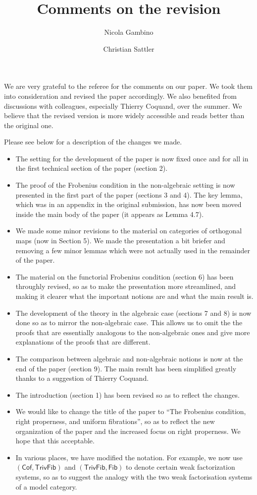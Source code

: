 \documentclass[reqno,10pt,a4paper,oneside,draft]{amsart}
\begin{document}
\title{Comments on the revision} 

\author{Nicola Gambino \and Christian Sattler} 

\maketitle

We are very grateful to the referee for the comments on our paper. We took them into consideration and revised the paper accordingly. We also benefited from
discussions with colleagues, especially Thierry Coquand, over the summer. We believe that the revised version is
more widely accessible and reads better than the original one. 

Please see below for a description of the changes we made.

\begin{itemize}
\item The setting for the development of the paper is now fixed once and for all in the first technical section of the paper (section 2). 
\item The proof of the Frobenius condition in the non-algebraic setting is now presented in the first part of the paper (sections 3 and 4). 
The key lemma, which was in an appendix in the original submission, has now been moved inside the main body of the paper (it appears as Lemma 4.7). 
\item We made some minor revisions to the material on categories of orthogonal maps (now in Section 5). We made the presentation a bit briefer and removing a few minor 
lemmas which were not actually used  in the remainder of the paper.
\item The material on the functorial Frobenius condition (section 6) has been throughly revised, so as to make the presentation more streamlined, and making it 
clearer what the important notions are and what the main result is. 
\item The development of the theory in the algebraic case (sections 7 and 8) is now done so as to mirror the non-algebraic case. This allows us to omit the 
the proofs that are essentially analogous to the non-algebraic ones and give more explanations of the proofs that are different.
\item The comparison between algebraic and non-algebraic notions is now at the end of the paper (section 9). The main result has been simplified greatly thanks to a
suggestion of Thierry Coquand. 
\item The introduction (section 1) has been revised so as to reflect the changes. 
\item We would like  to change the title of the paper to ``The Frobenius condition, right properness, and uniform fibrations'', so as to reflect the new organization of
the paper and the increased focus on right properness. We hope that this acceptable.
\item In various places, we have modified the notation. For example, we now use $(\mathsf{Cof}, \mathsf{TrivFib})$ and $(\mathsf{TrivFib}, \mathsf{Fib})$ to denote
certain weak factorization systems, so as to suggest the analogy with the two weak factorisation systems of a model category.
\end{itemize}
\end{document}

